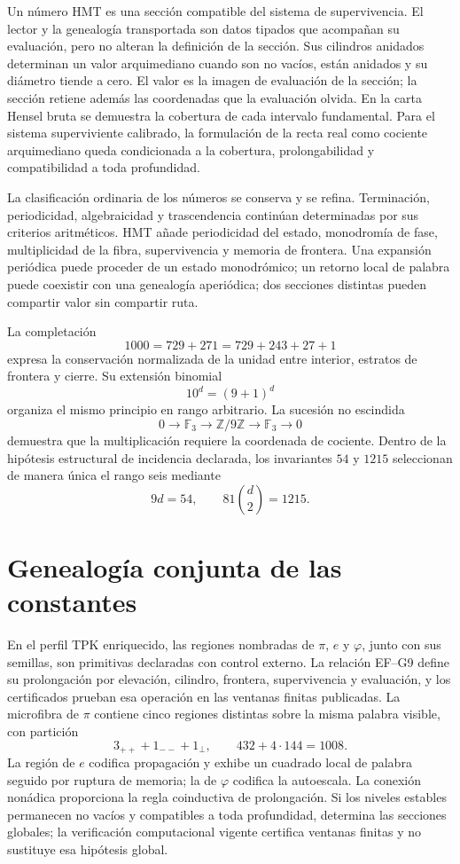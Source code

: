 Un número HMT es una sección compatible del sistema de supervivencia. El
lector y la genealogía transportada son datos tipados que acompañan su
evaluación, pero no alteran la definición de la sección. Sus cilindros
anidados determinan un valor arquimediano cuando son no vacíos, están
anidados y su diámetro tiende a cero. El valor es la imagen de evaluación de
la sección; la sección retiene además las coordenadas que la evaluación
olvida. En la carta Hensel bruta se demuestra la cobertura de cada intervalo
fundamental. Para el sistema superviviente calibrado, la formulación de la
recta real como cociente arquimediano queda condicionada a la cobertura,
prolongabilidad y compatibilidad a toda profundidad.

La clasificación ordinaria de los números se conserva y se refina.
Terminación, periodicidad, algebraicidad y trascendencia continúan
determinadas por sus criterios aritméticos. HMT añade periodicidad del estado,
monodromía de fase, multiplicidad de la fibra, supervivencia y memoria de
frontera. Una expansión periódica puede proceder de un estado monodrómico; un
retorno local de palabra puede coexistir con una genealogía aperiódica; dos
secciones distintas pueden compartir valor sin compartir ruta.

La completación
\[
1000=729+271=729+243+27+1
\]
expresa la conservación normalizada de la unidad entre interior, estratos de
frontera y cierre. Su extensión binomial
\[
10^d=(9+1)^d
\]
organiza el mismo principio en rango arbitrario. La sucesión no escindida
\[
0\longrightarrow\mathbb F_3\longrightarrow
\mathbb Z/9\mathbb Z\longrightarrow\mathbb F_3\longrightarrow0
\]
demuestra que la multiplicación requiere la coordenada de cociente. Dentro
de la hipótesis estructural de incidencia declarada, los invariantes \(54\) y \(1215\)
seleccionan de manera única el rango seis mediante
\[
9d=54,\qquad81\binom d2=1215.
\]

\section{Genealogía conjunta de las constantes}

En el perfil TPK enriquecido, las regiones nombradas de \(\pi\), \(e\) y
\(\varphi\), junto con sus semillas, son primitivas declaradas con control
externo. La relación EF--G9 define su prolongación por elevación, cilindro,
frontera, supervivencia y evaluación, y los certificados prueban esa
operación en las ventanas finitas publicadas. La microfibra de \(\pi\)
contiene cinco regiones distintas sobre la misma palabra visible, con
partición
\[
3_{++}+1_{--}+1_{\perp},
\qquad
432+4\cdot144=1008.
\]
La región de \(e\) codifica propagación y exhibe un cuadrado local de palabra
seguido por ruptura de memoria; la de \(\varphi\) codifica la autoescala. La
conexión nonádica proporciona la regla coinductiva de prolongación. Si los
niveles estables permanecen no vacíos y compatibles a toda profundidad,
determina las secciones globales; la verificación computacional vigente
certifica ventanas finitas y no sustituye esa hipótesis global.


